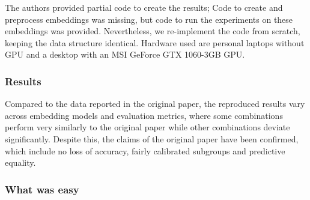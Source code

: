 
The authors provided partial code to create the results;
Code to create and preprocess embeddings was missing, but code to run the experiments on these embeddings was provided.
Nevertheless, we re-implement the code from scratch, keeping the data structure identical.
Hardware used are personal laptops without GPU and a desktop with an MSI GeForce GTX 1060-3GB GPU.

\subsubsection*{Results}

Compared to the data reported in the original paper, the reproduced results vary across embedding models and evaluation metrics, where some combinations perform very similarly to the original paper while other combinations deviate significantly.
Despite this, the claims of the original paper have been confirmed, which include no loss of accuracy, fairly calibrated subgroups and predictive equality.


\subsubsection*{What was easy}

